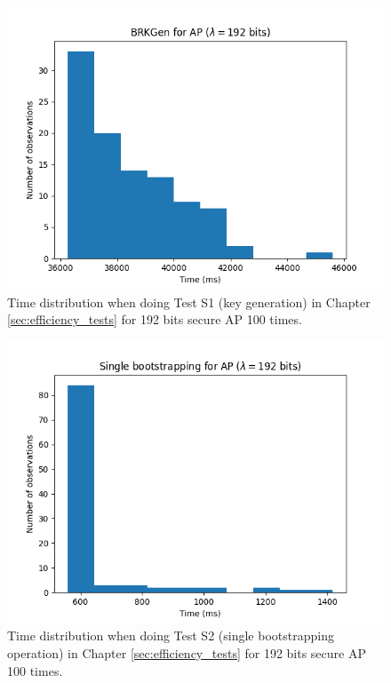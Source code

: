 \begin{figure}[ht]
    \centering
    \includegraphics[width=0.8\linewidth]{data/figures/AP_STD192_BRKGen.png}
    \caption{Time distribution when doing Test S1 (key generation) in Chapter \ref{sec:efficiency_tests} for 192 bits secure AP 100 times.}
    \label{fig:distr_ap192_keygen}
\end{figure}

\begin{figure}[ht]
    \centering
    \includegraphics[width=0.8\linewidth]{data/figures/AP_STD192_Single_bootstrapping.png}
    \caption{Time distribution when doing Test S2 (single bootstrapping operation) in Chapter \ref{sec:efficiency_tests} for 192 bits secure AP 100 times.}
    \label{fig:distr_AP192_bs}
\end{figure}

